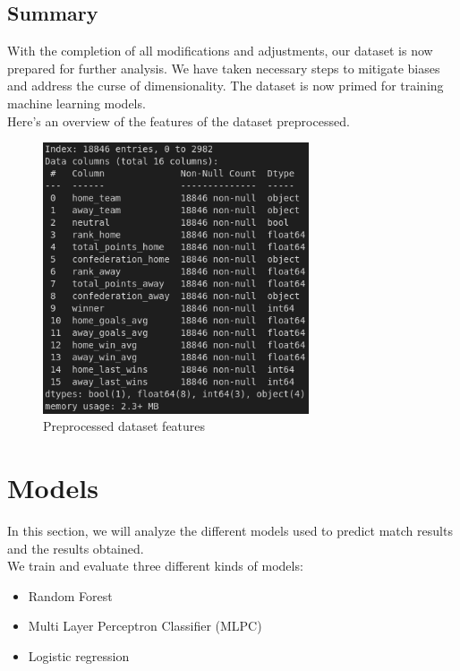 \documentclass[a4paper,12pt]{article}
\begin{document}
\subsection{Summary}

With the completion of all modifications and adjustments, our dataset is now prepared for further analysis. We have taken necessary steps to mitigate biases and address the curse of dimensionality. The dataset is now primed for training machine learning models.\\

Here's an overview of the features of the dataset preprocessed.

\begin{figure}[H]
  \centering
  \includegraphics[width=0.7\textwidth]{./images/df_info.png}
  \caption{Preprocessed dataset features}
  \label{fig:dataset_features}
\end{figure}

\section{Models}

In this section, we will analyze the different models used to predict match results and the results obtained.\\
We train and evaluate three different kinds of models:
\begin{itemize}
    \item Random Forest
    \item Multi Layer Perceptron Classifier (MLPC)
    \item Logistic regression
\end{itemize}
\end{document}
